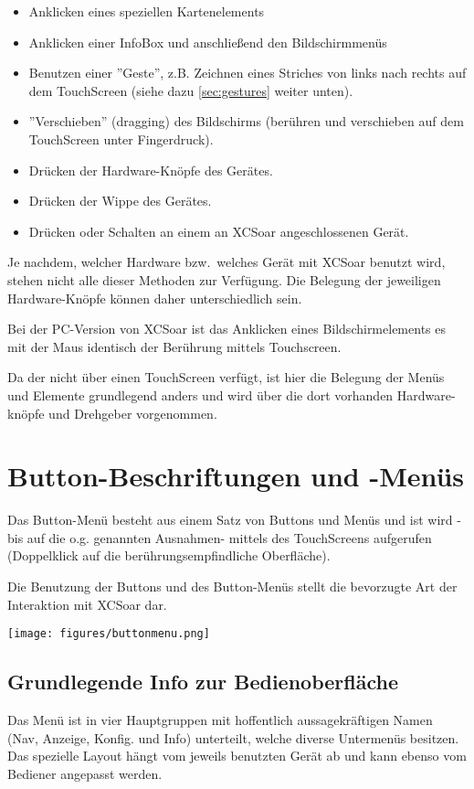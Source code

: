 \begin{itemize}
\item Anklicken eines speziellen Kartenelements
\item Anklicken einer InfoBox und anschließend den Bildschirmmenüs
\item Benutzen einer ''Geste'', z.B. Zeichnen eines Striches von links nach rechts auf dem TouchScreen
 (siehe dazu  \ref{sec:gestures} weiter unten).
\item ''Verschieben'' (dragging) des Bildschirms (berühren und verschieben auf dem TouchScreen unter Fingerdruck).
\item Drücken der Hardware-Knöpfe des  Gerätes.
\item Drücken der Wippe des Gerätes.
\item Drücken  oder Schalten  an einem an \textsf{XCSoar} angeschlossenen Gerät.
\end{itemize}

Je nachdem, welcher Hardware bzw.\ welches Gerät mit \textsf{XCSoar}  benutzt wird, stehen nicht alle dieser Methoden zur Verfügung. Die Belegung der jeweiligen Hardware-Knöpfe können daher unterschiedlich sein.

Bei der \textsf{PC}-Version von \textsf{XCSoar} ist das Anklicken eines Bildschirmelements es mit der Maus identisch der Berührung mittels Touchscreen.

Da der \al nicht über einen TouchScreen verfügt, ist hier die Belegung der Menüs und Elemente grundlegend anders und wird über die dort vorhanden Hardware-knöpfe und Drehgeber vorgenommen.


\section{Button-Beschriftungen und -Menüs}
Das Button-Menü besteht aus einem Satz von Buttons und Menüs und ist wird -bis auf die o.g. genannten Ausnahmen- mittels des TouchScreens aufgerufen (Doppelklick auf die berührungsempfindliche Oberfläche).

Die Benutzung der Buttons und des Button-Menüs  stellt die bevorzugte Art der Interaktion mit \textsf{XCSoar} dar.

\begin{center}
\texttt{[image: figures/buttonmenu.png]}
\end{center}

\subsection*{Grundlegende Info zur Bedienoberfläche}
Das Menü ist in vier Hauptgruppen mit hoffentlich aussagekräftigen Namen (Nav, Anzeige, Konfig. und Info) unterteilt, welche diverse Untermenüs besitzen. Das spezielle Layout hängt vom jeweils benutzten Gerät ab und kann ebenso vom Bediener angepasst werden.


